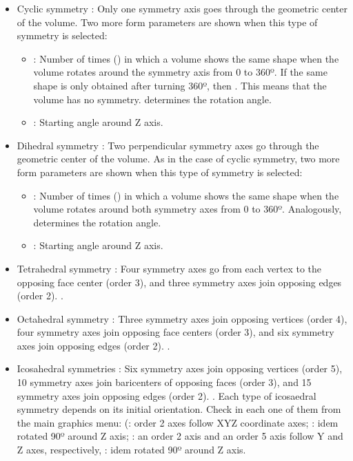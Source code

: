 \begin{itemize}
\begin{itemize}
  \begin{itemize}
  \item Cyclic symmetry : Only one symmetry axis goes through the geometric center of the volume. Two more form parameters are shown when this type of symmetry is selected:
   \begin{itemize}
    \item {}: Number of times () in which a volume shows the same shape when the volume rotates around the symmetry axis from 0 to 360º. If the same shape is only obtained after turning 360º, then . This means that the volume has no symmetry.  determines the rotation angle. 
	\item {}: Starting angle around Z axis. 
   \end{itemize}
  \item Dihedral symmetry : Two perpendicular symmetry axes go through the geometric center of the volume. As in the case of cyclic symmetry, two more form parameters are shown when this type of symmetry is selected:
   \begin{itemize}
    \item {}: Number of times () in which a volume shows the same shape when the volume rotates around both symmetry axes from 0 to 360º. Analogously,  determines the rotation angle. 
	\item {}: Starting angle around Z axis. 
   \end{itemize}
  \item Tetrahedral symmetry : Four symmetry axes go from each vertex to the opposing face center (order 3), and three symmetry axes join opposing edges (order 2). .
  \item Octahedral symmetry : Three symmetry axes join opposing vertices (order 4), four symmetry axes join opposing face centers (order 3), and six symmetry axes join opposing edges (order 2). .
  \item Icosahedral symmetries : Six symmetry axes join opposing vertices (order 5), 10 symmetry axes join baricenters of opposing faces (order 3), and 15 symmetry axes join opposing edges (order 2). . Each type of icosaedral symmetry depends on its initial orientation. Check in \chimera each one of them from the main graphics menu:  (: order 2 axes follow XYZ coordinate axes; : idem rotated 90º around Z axis; : an order 2 axis and an order 5 axis follow Y and Z axes, respectively, : idem rotated 90º around Z axis.
  \end{itemize}
  

\end{itemize}
\end{itemize}
